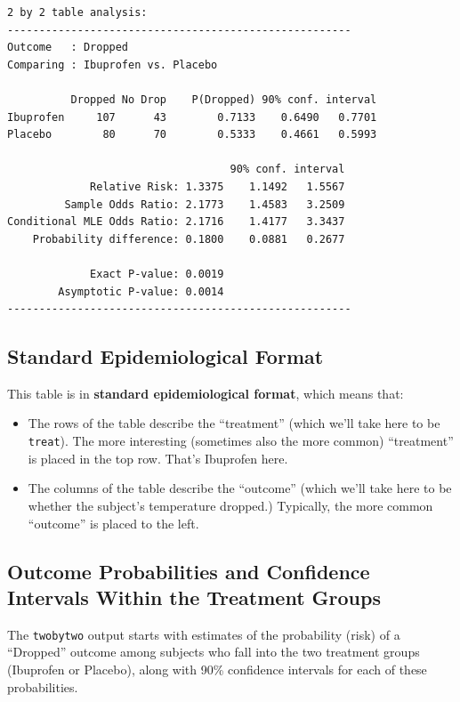 \documentclass[
]{book}
\providecommand{\tightlist}{%
  \setlength{\itemsep}{0pt}\setlength{\parskip}{0pt}}
\begin{document}
\begin{verbatim}
2 by 2 table analysis: 
------------------------------------------------------ 
Outcome   : Dropped 
Comparing : Ibuprofen vs. Placebo 

          Dropped No Drop    P(Dropped) 90% conf. interval
Ibuprofen     107      43        0.7133    0.6490   0.7701
Placebo        80      70        0.5333    0.4661   0.5993

                                   90% conf. interval
             Relative Risk: 1.3375    1.1492   1.5567
         Sample Odds Ratio: 2.1773    1.4583   3.2509
Conditional MLE Odds Ratio: 2.1716    1.4177   3.3437
    Probability difference: 0.1800    0.0881   0.2677

             Exact P-value: 0.0019 
        Asymptotic P-value: 0.0014 
------------------------------------------------------
\end{verbatim}

\hypertarget{standard-epidemiological-format}{%
\subsection{Standard Epidemiological Format}\label{standard-epidemiological-format}}

This table is in \textbf{standard epidemiological format}, which means that:

\begin{itemize}
\tightlist
\item
  The rows of the table describe the ``treatment'' (which we'll take here to be \texttt{treat}). The more interesting (sometimes also the more common) ``treatment'' is placed in the top row. That's Ibuprofen here.
\item
  The columns of the table describe the ``outcome'' (which we'll take here to be whether the subject's temperature dropped.) Typically, the more common ``outcome'' is placed to the left.
\end{itemize}

\hypertarget{outcome-probabilities-and-confidence-intervals-within-the-treatment-groups}{%
\subsection{Outcome Probabilities and Confidence Intervals Within the Treatment Groups}\label{outcome-probabilities-and-confidence-intervals-within-the-treatment-groups}}

The \texttt{twobytwo} output starts with estimates of the probability (risk) of a ``Dropped'' outcome among subjects who fall into the two treatment groups (Ibuprofen or Placebo), along with 90\% confidence intervals for each of these probabilities.
\end{document}
